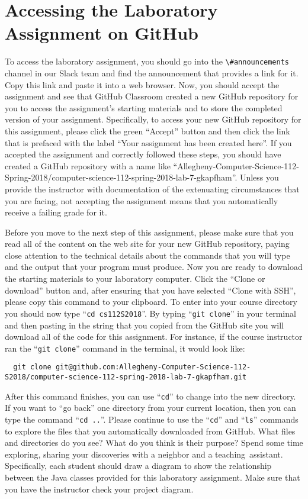 \documentclass[11pt]{article}
\newcommand{\command}[1]{``\lstinline{#1}''}
\newcommand{\channel}[1]{\lstinline{#1}}
\newcommand{\step}[1]{``{#1}''}
\begin{document}
\section*{Accessing the Laboratory Assignment on GitHub}

To access the laboratory assignment, you should go into the
\channel{\#announcements} channel in our Slack team and find the announcement
that provides a link for it. Copy this link and paste it into a web browser.
Now, you should accept the assignment and see that GitHub Classroom created a
new GitHub repository for you to access the assignment's starting materials and
to store the completed version of your assignment. Specifically, to access your
new GitHub repository for this assignment, please click the green ``Accept''
button and then click the link that is prefaced with the label ``Your assignment
has been created here''. If you accepted the assignment and correctly followed
these steps, you should have created a GitHub repository with a name like
``Allegheny-Computer-Science-112-Spring-2018/computer-science-112-spring-2018-lab-7-gkapfham''.
Unless you provide the instructor with documentation of the extenuating
circumstances that you are facing, not accepting the assignment means that you
automatically receive a failing grade for it.

Before you move to the next step of this assignment, please make sure that you
read all of the content on the web site for your new GitHub repository, paying
close attention to the technical details about the commands that you will type
and the output that your program must produce. Now you are ready to download the
starting materials to your laboratory computer. Click the ``Clone or download''
button and, after ensuring that you have selected ``Clone with SSH'', please
copy this command to your clipboard. To enter into your course directory you
should now type \command{cd cs112S2018}. By typing \command{git clone} in your
terminal and then pasting in the string that you copied from the GitHub site you
will download all of the code for this assignment. For instance, if the course
instructor ran the \command{git clone} command in the terminal, it would look
like:

\begin{lstlisting}
  git clone git@github.com:Allegheny-Computer-Science-112-S2018/computer-science-112-spring-2018-lab-7-gkapfham.git
\end{lstlisting}

After this command finishes, you can use \command{cd} to change into the new
directory. If you want to \step{go back} one directory from your current
location, then you can type the command \command{cd ..}. Please continue to use
the \command{cd} and \command{ls} commands to explore the files that you
automatically downloaded from GitHub. What files and directories do you see?
What do you think is their purpose? Spend some time exploring, sharing your
discoveries with a neighbor and a \mbox{teaching assistant}. Specifically, each
student should draw a diagram to show the relationship between the Java classes
provided for this laboratory assignment. Make sure that you have the instructor
check your project diagram.
\end{document}
